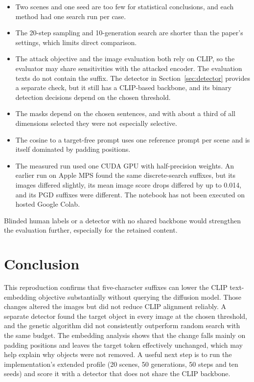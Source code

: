 \documentclass[11pt]{article}
\begin{document}
\begin{itemize}
\item Two scenes and one seed are too few for statistical conclusions, and each method had one search run per case.
\item The 20-step sampling and 10-generation search are shorter than the paper's settings, which limits direct comparison.
\item The attack objective and the image evaluation both rely on CLIP, so the evaluator may share sensitivities with the attacked encoder. The evaluation texts do not contain the suffix. The detector in Section~\ref{sec:detector} provides a separate check, but it still has a CLIP-based backbone, and its binary detection decisions depend on the chosen threshold.
\item The masks depend on the chosen sentences, and with about a third of all dimensions selected they were not especially selective.
\item The cosine to a target-free prompt uses one reference prompt per scene and is itself dominated by padding positions.
\item The measured run used one CUDA GPU with half-precision weights. An earlier run on Apple MPS found the same discrete-search suffixes, but its images differed slightly, its mean image score drops differed by up to 0.014, and its PGD suffixes were different. The notebook has not been executed on hosted Google Colab.
\end{itemize}

Blinded human labels or a detector with no shared backbone would strengthen the evaluation further, especially for the retained content.

\section{Conclusion}

This reproduction confirms that five-character suffixes can lower the CLIP text-embedding objective substantially without querying the diffusion model. Those changes altered the images but did not reduce CLIP alignment reliably. A separate detector found the target object in every image at the chosen threshold, and the genetic algorithm did not consistently outperform random search with the same budget. The embedding analysis shows that the change falls mainly on padding positions and leaves the target token effectively unchanged, which may help explain why objects were not removed. A useful next step is to run the implementation's extended profile (20 scenes, 50 generations, 50 steps and ten seeds) and score it with a detector that does not share the CLIP backbone.
\end{document}
